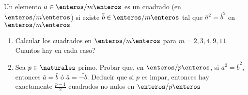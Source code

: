 \begin{enunciado}{\ejercicio}
    Un elemento $\bar{a} \in \enteros/m\enteros$ es un cuadrado (en $\enteros/m\enteros$) si existe
    $\bar{b} \in \enteros/m\enteros$ tal que $\bar{a}^2 = \bar{b}^2$ en $\enteros/m\enteros$
    \begin{enumerate}[label=\roman*)]
        \item Calcular los cuadrados en $\enteros/m\enteros$ para $m = 2, 3, 4, 9, 11$. Cuantos hay en cada caso?
        \item Sea $p \in \naturales$ primo. Probar que, en  $\enteros/p\enteros$, si $\bar{a}^2 = \bar{b}^2$, 
        entonces $\bar{a} = \bar{b}$ ó $\bar{a} = \bar{-b}$. Deducir que si $p$ es impar, entonces 
        hay exactamente $\frac{p-1}{2}$ cuadrados no nulos en $\enteros/p\enteros$
    \end{enumerate}
\end{enunciado}

